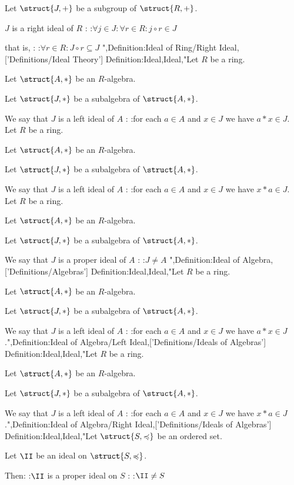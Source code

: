 Let $\struct {J, +}$ be a subgroup of $\struct {R, +}$.


$J$ is a right ideal of $R$ :
:$\forall j \in J: \forall r \in R: j \circ r \in J$

that is, :
:$\forall r \in R: J \circ r \subseteq J$
",Definition:Ideal of Ring/Right Ideal,['Definitions/Ideal Theory']
Definition:Ideal,Ideal,"Let $R$ be a ring.

Let $\struct {A, \ast}$ be an $R$-algebra.

Let $\struct {J, \ast}$ be a subalgebra of $\struct {A, \ast}$. 


We say that $J$ is a left ideal of $A$ :
:for each $a \in A$ and $x \in J$ we have $a \ast x \in J$.
Let $R$ be a ring.

Let $\struct {A, \ast}$ be an $R$-algebra.

Let $\struct {J, \ast}$ be a subalgebra of $\struct {A, \ast}$. 


We say that $J$ is a left ideal of $A$ :
:for each $a \in A$ and $x \in J$ we have $x \ast a \in J$.
Let $R$ be a ring.

Let $\struct {A, \ast}$ be an $R$-algebra.

Let $\struct {J, \ast}$ be a subalgebra of $\struct {A, \ast}$. 


We say that $J$ is a proper ideal of $A$ :
:$J \ne A$
",Definition:Ideal of Algebra,['Definitions/Algebras']
Definition:Ideal,Ideal,"Let $R$ be a ring.

Let $\struct {A, \ast}$ be an $R$-algebra.

Let $\struct {J, \ast}$ be a subalgebra of $\struct {A, \ast}$. 


We say that $J$ is a left ideal of $A$ :
:for each $a \in A$ and $x \in J$ we have $a \ast x \in J$.",Definition:Ideal of Algebra/Left Ideal,['Definitions/Ideals of Algebras']
Definition:Ideal,Ideal,"Let $R$ be a ring.

Let $\struct {A, \ast}$ be an $R$-algebra.

Let $\struct {J, \ast}$ be a subalgebra of $\struct {A, \ast}$. 


We say that $J$ is a left ideal of $A$ :
:for each $a \in A$ and $x \in J$ we have $x \ast a \in J$.",Definition:Ideal of Algebra/Right Ideal,['Definitions/Ideals of Algebras']
Definition:Ideal,Ideal,"Let $\struct {S, \preccurlyeq}$ be an ordered set.

Let $\II$ be an ideal on $\struct {S, \preccurlyeq}$.


Then:
:$\II$ is a proper ideal on $S$
:
:$\II \ne S$

